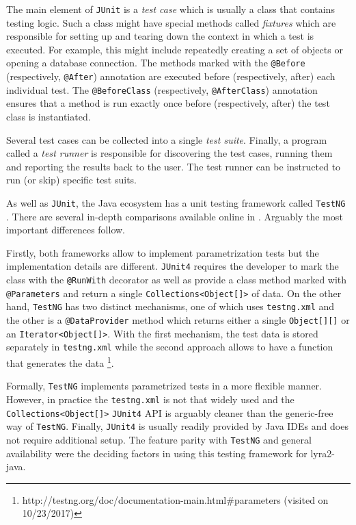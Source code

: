 The main element of \texttt{JUnit} is a \emph{test case} which is usually a class that contains testing logic. Such a class might have special methods called \emph{fixtures} which are responsible for setting up and tearing down the context in which a test is executed. For example, this might include repeatedly creating a set of objects or opening a database connection. The methods marked with the \texttt{@Before} (respectively, \texttt{@After}) annotation are executed before (respectively, after) each individual test. The \texttt{@BeforeClass} (respectively, \texttt{@AfterClass}) annotation ensures that a method is run exactly once before (respectively, after) the test class is instantiated.

Several test cases can be collected into a single \emph{test suite}. Finally, a program called a \emph{test runner} is responsible for discovering the test cases, running them and reporting the results back to the user. The test runner can be instructed to run (or skip) specific test suits.

As well as \texttt{JUnit}, the Java ecosystem has a unit testing framework called \texttt{TestNG} \cite{testng:2017:home}. There are several in-depth comparisons available online in \cite{mkyong:2017:testng-vs-junit, wiki:2017:testng-vs-junit}. Arguably the most important differences follow.

Firstly, both frameworks allow to implement parametrization tests but the implementation details are different.  \texttt{JUnit4} requires the developer to mark the class with the \texttt{@RunWith} decorator as well as provide a class method marked with \texttt{@Parameters} and return a single \texttt{Collections<Object[]>} of data. On the other hand, \texttt{TestNG} has two distinct mechanisms, one of which uses \texttt{testng.xml} and the other is a \texttt{@DataProvider} method which returns either a single \texttt{Object[][]} or an \texttt{Iterator<Object[]>}. With the first mechanism, the test data is stored separately in \texttt{testng.xml} while the second approach allows to have a function that generates the data \footnote{http://testng.org/doc/documentation-main.html\#parameters (visited on 10/23/2017)}.

Formally, \texttt{TestNG} implements parametrized tests in a more flexible manner. However, in practice the \texttt{testng.xml} is not that widely used and the \texttt{Collections<Object[]>} \texttt{JUnit4} API is arguably cleaner than the generic-free way of \texttt{TestNG}. Finally, \texttt{JUnit4} is usually readily provided by Java IDEs and does not require additional setup. The feature parity with \texttt{TestNG} and general availability were the deciding factors in using this testing framework for lyra2-java.

